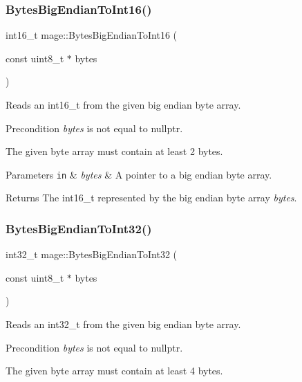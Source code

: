 \subsubsection{\texorpdfstring{Bytes\+Big\+Endian\+To\+Int16()}{BytesBigEndianToInt16()}}
{\footnotesize\ttfamily int16\+\_\+t mage\+::\+Bytes\+Big\+Endian\+To\+Int16 (\begin{DoxyParamCaption}\item[{const uint8\+\_\+t $\ast$}]{bytes }\end{DoxyParamCaption})}

Reads an int16\+\_\+t from the given big endian byte array.

\begin{DoxyPrecond}{Precondition}
{\itshape bytes} is not equal to {\ttfamily nullptr}. 

The given byte array must contain at least 2 bytes. 
\end{DoxyPrecond}

\begin{DoxyParams}[1]{Parameters}
\mbox{\tt in}  & {\em bytes} & A pointer to a big endian byte array. \\
\hline
\end{DoxyParams}
\begin{DoxyReturn}{Returns}
The {\ttfamily int16\+\_\+t} represented by the big endian byte array {\itshape bytes}. 
\end{DoxyReturn}
\hypertarget{namespacemage_ae98f64655a7d791c6c6efba16ce6b8e8}{}\label{namespacemage_ae98f64655a7d791c6c6efba16ce6b8e8} 
\subsubsection{\texorpdfstring{Bytes\+Big\+Endian\+To\+Int32()}{BytesBigEndianToInt32()}}
{\footnotesize\ttfamily int32\+\_\+t mage\+::\+Bytes\+Big\+Endian\+To\+Int32 (\begin{DoxyParamCaption}\item[{const uint8\+\_\+t $\ast$}]{bytes }\end{DoxyParamCaption})}

Reads an int32\+\_\+t from the given big endian byte array.

\begin{DoxyPrecond}{Precondition}
{\itshape bytes} is not equal to {\ttfamily nullptr}. 

The given byte array must contain at least 4 bytes. 
\end{DoxyPrecond}

